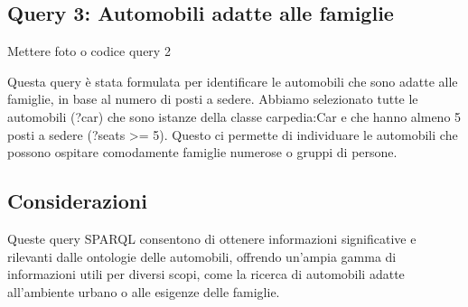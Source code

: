\subsection{Query 3: Automobili adatte alle famiglie}

Mettere foto o codice query 2

Questa query è stata formulata per identificare le automobili che sono adatte alle famiglie, in base al numero
di posti a sedere. Abbiamo selezionato tutte le automobili (?car) che sono istanze della classe carpedia:Car e
che hanno almeno 5 posti a sedere (?seats >= 5). Questo ci permette di individuare le automobili che possono
ospitare comodamente famiglie numerose o gruppi di persone.

\subsection{Considerazioni}
Queste query SPARQL consentono di ottenere informazioni significative e rilevanti dalle ontologie delle automobili,
offrendo un'ampia gamma di informazioni utili per diversi scopi, come la ricerca di automobili adatte all'ambiente
urbano o alle esigenze delle famiglie.
